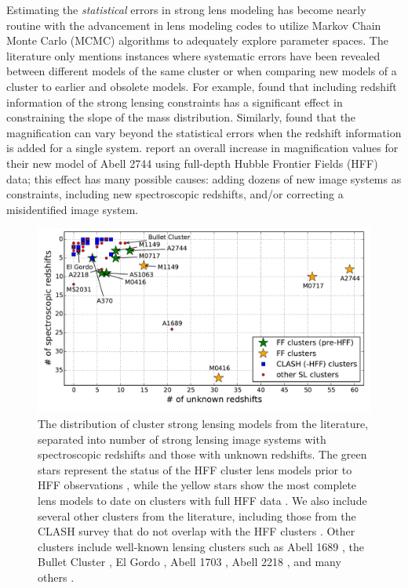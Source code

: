 Estimating the {\it statistical} errors in strong lens modeling has become nearly routine with the advancement in lens modeling codes to utilize Markov Chain Monte Carlo (MCMC) algorithms to adequately explore parameter spaces. The literature only mentions instances where systematic errors have been revealed between different models of the same cluster or when comparing new models of a cluster to earlier and obsolete models. For example, \citet{Smith:2009lr} found that including redshift information of the strong lensing constraints has a significant effect in constraining the slope of the mass distribution. Similarly, \citet{Johnson:2014tg} found that the magnification can vary beyond the statistical errors when the redshift information is added for a single system. \citet{Jauzac:2015xy} report an overall increase in magnification values for their new model of Abell 2744 using full-depth Hubble Frontier Fields (HFF) data; this effect has many possible causes: adding dozens of new image systems as constraints, including new spectroscopic redshifts, and/or correcting a misidentified image system.

\begin{figure}
\center
\includegraphics[width=\textwidth]{Chap3/c3f1.pdf}
\caption[Strong lensing models from the literature]{The distribution of cluster strong lensing models from the literature, separated into number of strong lensing image systems with spectroscopic redshifts and those with unknown redshifts. The green stars represent the status of the HFF cluster lens models prior to HFF observations \citep{Johnson:2014tg,Richard:2014gf}, while the yellow stars show the most complete lens models to date on clusters with full HFF data \citep{Caminha:2016fk,Limousin:2016ty,Kawamata:2016nr,Treu:2016lr,Jauzac:2016dn,Jauzac:2014qd,Jauzac:2015xy}. We also include several other clusters from the literature, including those from the CLASH survey that do not overlap with the HFF clusters \citep{Zitrin:2015lq}. Other clusters include well-known lensing clusters such as Abell 1689 \citep{Diego:2015tg}, the Bullet Cluster \citep{Bradac:2009qd}, El Gordo \citep{Zitrin:2013hl}, Abell 1703 \citep{Limousin:2008lr}, Abell 2218 \citep{Eliasdottir:2007ve}, and many others \citep{Sharon:2015xe,Richard:2015lr,Richard:2010zp,Richard:2007rr,Sharon:2014fj,Bayliss:2014lr,Sharon:2012ly,Zitrin:2011qy}.}
\label{chap3:fig:slclusters}
\end{figure}


